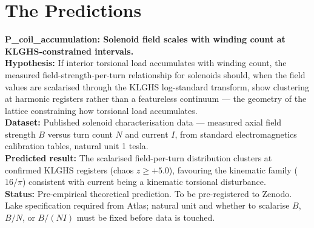 \documentclass[11pt, letterpaper, openany]{book}
\begin{document}
\section{The Predictions}
 
\begin{predictionbox}
\textbf{P\_coil\_accumulation: Solenoid field scales with winding count at
KLGHS-constrained intervals.}\\[0.5em]
\textbf{Hypothesis:} If interior torsional load accumulates with winding
count, the measured field-strength-per-turn relationship for solenoids
should, when the field values are scalarised through the KLGHS log-standard
transform, show clustering at harmonic registers rather than a featureless
continuum --- the geometry of the lattice constraining how torsional load
accumulates.\\[0.5em]
\textbf{Dataset:} Published solenoid characterisation data --- measured
axial field strength $B$ versus turn count $N$ and current $I$, from
standard electromagnetics calibration tables, natural unit 1 tesla.\\[0.5em]
\textbf{Predicted result:} The scalarised field-per-turn distribution
clusters at confirmed KLGHS registers (chaos $z \geq +5.0$), favouring the
kinematic family ($16/\pi$) consistent with current being a kinematic
torsional disturbance.\\[0.5em]
\textbf{Status:} Pre-empirical theoretical prediction. To be pre-registered
to Zenodo. Lake specification required from Atlas; natural unit and whether
to scalarise $B$, $B/N$, or $B/(NI)$ must be fixed before data is touched.
\end{predictionbox}
 
\end{document}
